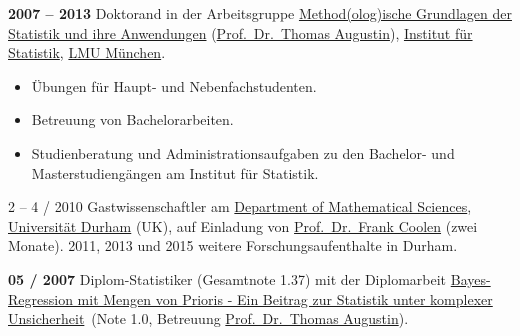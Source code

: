 \documentclass[a4paper]{simplecv}
\begin{document}
\begin{topic}
\item[\hspace*{-2ex}\bfseries 2007 -- 2013] Doktorand in der Arbeitsgruppe
                    \href{http://www.statistik.lmu.de/institut/ag/agmg/index.html}{\glqq Method(olog)ische Grundlagen der Statistik und ihre Anwendungen\grqq}
                    (\href{http://www.statistik.lmu.de/~thomas/}{Prof.\ Dr.\ Thomas Augustin}),
                    \href{http://www.statistik.lmu.de/index.html}{Institut für Statistik}, \href{http://www.lmu.de/}{LMU München}.
\begin{itemize}
\item Übungen für Haupt- und Nebenfachstudenten.
\item Betreuung von Bachelorarbeiten.
\item Studienberatung und Administrationsaufgaben zu den Bachelor- und Masterstudiengängen am Institut für Statistik.
\end{itemize}

\item[2 -- 4 / 2010] Gastwissenschaftler am \href{http://www.dur.ac.uk/mathematical.sciences/}{Department of Mathematical Sciences},
                 \href{http://www.durham.ac.uk}{Universität Durham} (UK),
                 auf Einladung von \href{http://maths.dur.ac.uk/stats/people/fc/fc.html}{Prof.\ Dr.\ Frank Coolen} (zwei Monate).
                 2011, 2013 und 2015 weitere Forschungsaufenthalte in Durham.



\item[\hspace*{-2ex}\bfseries 05 / 2007] Diplom-Statistiker (Gesamtnote 1.37) mit der Diplomarbeit
\href{http://www.stat.uni-muenchen.de/~thomas/team/diplomathesis_GeroWalter.pdf}{\glqq Bayes-\-Re\-gres\-sion mit Mengen von Prioris - Ein Beitrag zur Statistik unter komplexer Unsicherheit\grqq}\
(Note 1.0, Betreuung \href{http://www.statistik.lmu.de/~thomas/}{Prof.\ Dr.\ Thomas Augustin}).


\end{topic}
\end{document}

